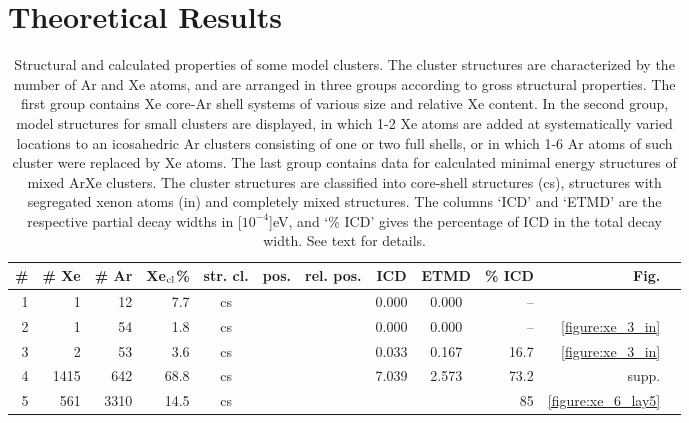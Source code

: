 \section{Theoretical Results
\label{sec:th_results}}
%
%
\begin{table}[H]
\small
\centering
\caption{Structural and calculated properties of some model clusters.
The cluster structures are characterized by the number of Ar and Xe atoms,
and are arranged in three groups according to gross structural properties. 
The first group contains Xe core-Ar shell systems of various
size and relative Xe content.
In the second group, model structures for small clusters are displayed,
in which 1-2 Xe atoms are added at systematically varied locations
to an icosahedric Ar clusters consisting of one or two full shells,
or in which 1-6 Ar atoms of such cluster were replaced by Xe atoms.
The last group contains data for calculated minimal energy structures
of mixed ArXe clusters.\protect\cite{marques}
The cluster structures are classified into core-shell structures (cs),
structures with segregated xenon atoms (in) and completely mixed
structures.
The columns `ICD' and `ETMD' are the respective partial decay widths
in \unit[$10^{-4}$]{eV}, and `\% ICD' gives the percentage of ICD in
the total decay width.
See text for details.
\label{table:theo_gammas}
}
\begin{tabular}{rrrrcccccrrr}
\toprule
\# & \# Xe & \# Ar & Xe$_{\rm cl}$\% & str. cl. & pos. & rel. pos. & ICD   &  ETMD & \% ICD & Fig.\\ %
\midrule
 1 &     1 &    12 &  7.7  & cs    &         &          & 0.000 & 0.000 &  -- &\\ %
 2 &     1 &    54 &  1.8  & cs    &         &          & 0.000 & 0.000 &  -- & \ref{figure:xe_3_in}\\ %
 3 &     2 &    53 &  3.6  & cs    &         &          & 0.033 & 0.167 &  16.7& \ref{figure:xe_3_in}\\ %
 4 &  1415 &   642 & 68.8  & cs    &         &          & 7.039 & 2.573 &  73.2& supp.\\ %
 5 &   561 &  3310 & 14.5  & cs    &         &          &       &       &  85  & \ref{figure:xe_6_lay5}\\ %
 

\end{tabular}
\end{table}
